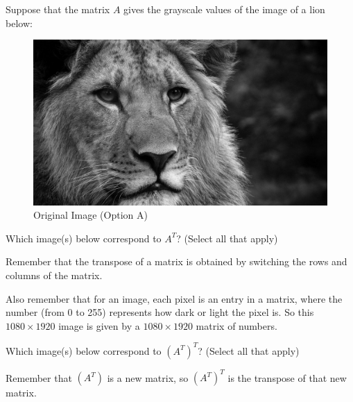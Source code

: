 \documentclass{ximera}
\author{Zack Reed}
\begin{document}
\begin{problem}

  Suppose that the matrix $A$ gives the grayscale values of the image of a lion below:

  \begin{figure}[h]
    \centering
      \includegraphics[width=.5\textwidth]{test_image.jpg}
      \caption{Original Image (Option A)}
      \label{fig:original}
  \end{figure}
  
  Which image(s) below correspond to $A^T$? (Select all that apply)
  
  \begin{hint}
  
    Remember that the transpose of a matrix is obtained by switching the rows and columns of the matrix.

    Also remember that for an image, each pixel is an entry in a matrix, where the number (from 0 to 255) represents how dark or light the pixel is. So this $1080 \times 1920$ image is given by a $1080 \times 1920$ matrix of numbers.

  \end{hint}

  \begin{selectAll}
  
  
  \end{selectAll}
  
  Which image(s) below correspond to $(A^T)^T$? (Select all that apply)

  \begin{hint}
  
    Remember that $(A^T)$ is a new matrix, so $(A^T)^T$ is the transpose of that new matrix.

  \end{hint}
  
  \begin{selectAll}
  
  

\end{selectAll}
\end{problem}
\end{document}
